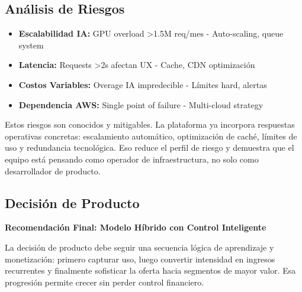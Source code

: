\documentclass[12pt]{article}
\begin{document}
\subsection{Análisis de Riesgos}

\begin{itemize}
    \item \textbf{Escalabilidad IA:} GPU overload >1.5M req/mes - Auto-scaling, queue system
    \item \textbf{Latencia:} Requests >2s afectan UX - Cache, CDN optimización
    \item \textbf{Costos Variables:} Overage IA impredecible - Límites hard, alertas
    \item \textbf{Dependencia AWS:} Single point of failure - Multi-cloud strategy
\end{itemize}

Estos riesgos son conocidos y mitigables. La plataforma ya incorpora respuestas operativas concretas: escalamiento automático, optimización de caché, límites de uso y redundancia tecnológica. Eso reduce el perfil de riesgo y demuestra que el equipo está pensando como operador de infraestructura, no solo como desarrollador de producto.

\subsection{Decisión de Producto}

\textbf{Recomendación Final: Modelo Híbrido con Control Inteligente}

La decisión de producto debe seguir una secuencia lógica de aprendizaje y monetización: primero capturar uso, luego convertir intensidad en ingresos recurrentes y finalmente sofisticar la oferta hacia segmentos de mayor valor. Esa progresión permite crecer sin perder control financiero.
\end{document}
